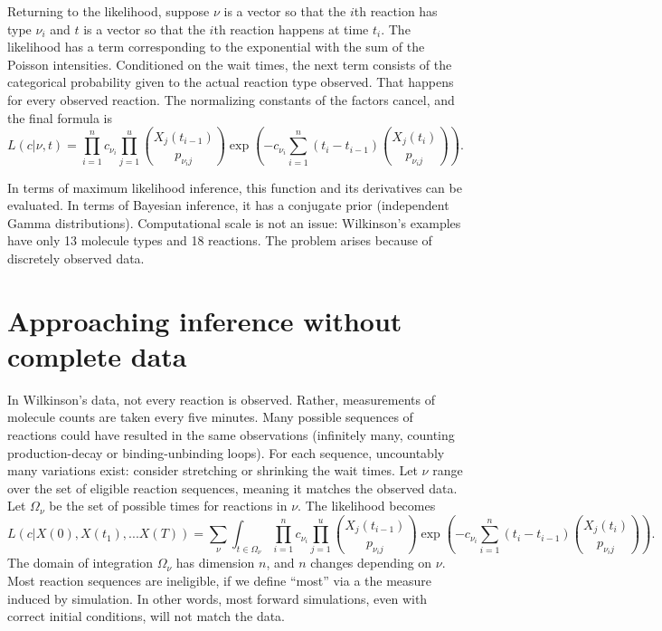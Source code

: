 \documentclass{article}
\begin{document}
Returning to the likelihood, suppose $\nu$ is a vector so that the $i$th reaction has type $\nu_i$ and $t$ is a vector so that the $i$th reaction happens at time $t_i$. The likelihood has a term corresponding to the exponential with the sum of the Poisson intensities. Conditioned on the wait times, the next term consists of the categorical probability given to the actual reaction type observed. That happens for every observed reaction. The normalizing constants of the factors cancel, and the final formula is $$L(c|\nu, t) = \prod_{i=1}^n c_{\nu_{i}} \prod_{j=1}^u {{X_{j}(t_{i-1})}\choose{p_{{\nu_{i}}j}}}\exp\left(-c_{\nu_{i}}\sum_{i=1}^{n} (t_{i}-t_{i-1}) {{X_j(t_{i})}\choose{p_{{\nu_{i}}j}}}\right).$$

In terms of maximum likelihood inference, this function and its derivatives can be evaluated. In terms of Bayesian inference, it has a conjugate prior (independent Gamma distributions). Computational scale is not an issue: Wilkinson's examples have only 13 molecule types and 18 reactions. The problem arises because of discretely observed data.

\section{Approaching inference without complete data}
\label{sec:intro_em}

In Wilkinson's data, not every reaction is observed. Rather, measurements of molecule counts are taken every five minutes. Many possible sequences of reactions could have resulted in the same observations (infinitely many, counting production-decay or binding-unbinding loops). For each sequence, uncountably many variations exist: consider stretching or shrinking the wait times. Let $\nu$ range over the set of eligible reaction sequences, meaning it matches the observed data. Let $\Omega_{\nu}$ be the set of possible times for reactions in $\nu$. The likelihood becomes 
\begin{equation}\label{eqn_nasty_lik}
L(c|X(0), X(t_1), ... X(T)) =\sum_{\nu}\int_{t\in \Omega_{\nu}} \prod_{i=1}^n c_{\nu_{i}} \prod_{j=1}^u {{X_{j}(t_{i-1})}\choose{p_{{\nu_{i}}j}}}\exp\left(-c_{\nu_{i}}\sum_{i=1}^{n} (t_{i}-t_{i-1}) {{X_j(t_{i})}\choose{p_{{\nu_{i}}j}}}\right).
\end{equation}
 The domain of integration $\Omega_{\nu}$ has dimension $n$, and $n$ changes depending on $\nu$. Most reaction sequences are ineligible, if we define ``most'' via a the measure induced by simulation. In other words, most forward simulations, even with correct initial conditions, will not match the data. 
\end{document}
